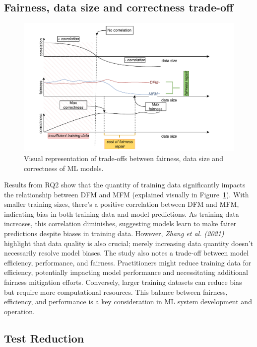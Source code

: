 \documentclass[sigconf,review]{acmart}
\begin{document}
\subsection{Fairness, data size and correctness trade-off}\label{sec:discuss-fair-eff-perf-trade}

\begin{figure}
  \centering
  \includegraphics[width=\linewidth]{tradeoff.pdf}
  \caption{Visual representation of trade-offs between fairness, data
    size and correctness of ML models.}
  \label{fig:tradeoff}
\end{figure}

Results from RQ2 show that the quantity of training data significantly
impacts the relationship between DFM and MFM (explained visually in
Figure~\ref{fig:tradeoff}). With smaller training sizes, there's
a positive correlation between DFM and MFM, indicating bias in both
training data and model predictions. As training data increases, this
correlation diminishes, suggesting models learn to make fairer
predictions despite biases in training data. However, \emph{Zhang et
al. (2021)}~\cite{zhang2021ignorance} highlight that data quality is
also crucial; merely increasing data quantity doesn't necessarily
resolve model biases. The study also notes a trade-off between model
efficiency, performance, and fairness. Practitioners might reduce
training data for efficiency, potentially impacting model performance
and necessitating additional fairness mitigation efforts. Conversely,
larger training datasets can reduce bias but require more
computational resources. This balance between fairness, efficiency,
and performance is a key consideration in ML system development and
operation.

\subsection{Test Reduction}\label{sec:discuss-test-red}
\end{document}
